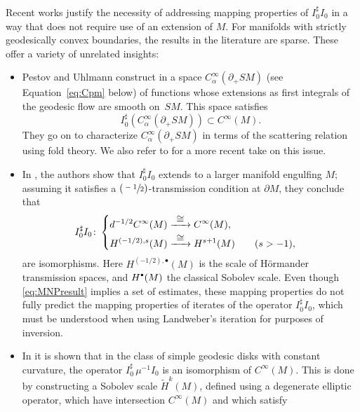 \documentclass[JEP,XML,SOM,Unicode,NoFloatCountersInSection, NoEqCountersInSection,published]{cedram}
\newcommand{\Psfrac}[2]{(\sfrac{#1}{#2})}
\newcommand{\bbullet}{{\scriptscriptstyle\bullet}}
\newcommand{\cbbullet}{{\raisebox{1pt}{$\bbullet$}}}
\def\To#1{\mathchoice{\xrightarrow{\textstyle\kern4pt#1\kern3pt}}{\stackrel{#1}{\longrightarrow}}{}{}}
\theoremstyle{plain}
\theoremstyle{definition}
\theoremstyle{remark}
\newcommand{\adj}{I_0^\sharp}
\newcommand{\wtH}{\widetilde{H}}
\newcommand{\del}{\partial}
\begin{document}
Recent works \cite{Monard2017,Monard2019,Monard2020a} justify the necessity of addressing mapping properties of $\adj I_0$ in a way
that does not require use of an extension of $M$. For manifolds with strictly geodesically convex boundaries, the results in the literature are sparse. These offer a variety of unrelated insights:
\begin{itemize}
\item Pestov and Uhlmann construct in \cite{Pestov2005} a space $C_{\alpha}^\infty(\partial_+ SM)$ (see Equation~\eqref{eq:Cpm} below)
of functions whose extensions as first integrals of the geodesic flow are smooth on~$SM$. This space satisfies
\begin{equation}
\adj (C_\alpha^\infty(\partial_+ SM)) \subset C^\infty(M).
\label{eq:PU}
\end{equation}
They go on to characterize $C_\alpha^\infty (\del_+ SM)$ in terms of the scattering relation using fold theory. We also refer to
\cite{Paternain2021} for a more recent take on this issue.
\item In \cite{Monard2017}, the authors show that $\adj I_0$ extends to a larger manifold engulfing $M$; assuming it
satisfies a $\Psfrac{-1}{2}$-transmission condition at $\partial M$, they conclude that
\begin{equation}
\adj I_0 \colon
\begin{cases}
\begin{aligned}
d^{-1/2} C^\infty(M) & \To{\cong} C^\infty(M), \\
H^{(-1/2), s}(M) & \To{\cong} H^{s+1}(M) \qquad (s>-1),
\end{aligned}
\end{cases}
\label{eq:MNPresult}
\end{equation}
are isomorphisms. Here $H^{(-1/2), \bbullet}(M)$ is the scale of Hörmander transmission spaces, and $H^{\cbbullet}(M)$ the classical Sobolev
scale. Even though \eqref{eq:MNPresult} implies a set of estimates, these mapping properties do not fully predict the mapping
properties of iterates of the operator $\adj I_0$, which must be understood when using Landweber's iteration for purposes of inversion.
\item In \cite{Monard2019a} it is shown that in the class of simple geodesic disks with constant curvature, the operator $\adj \, \mu^{-1} I_0$ is
an isomorphism of $C^\infty(M)$. This is done by constructing a Sobolev scale $\wtH^k(M)$, defined using a degenerate elliptic operator,
which have intersection $C^\infty(M)$ and which satisfy
\begin{equation*}

\end{equation*}
\end{itemize}
\end{document}
